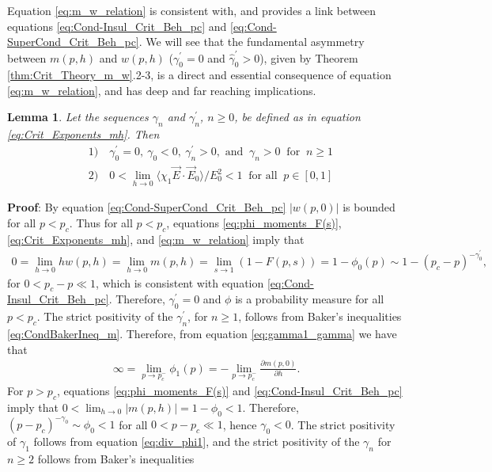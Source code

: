 \documentclass[english,12pt,jmp,graphicx]{revtex4-1}
\newtheorem{lemma}{Lemma}[section]
\newcommand{\gh}{\hat{\gamma}}
\begin{document}
Equation \eqref{eq:m_w_relation} is consistent with, and provides a
link between equations \eqref{eq:Cond-Insul_Crit_Beh_pc} and
\eqref{eq:Cond-SuperCond_Crit_Beh_pc}. We will see that the
fundamental asymmetry  between $m(p,h)$ and $w(p,h)$ ($\gamma_0^\prime=0$ and
$\gh_0^\prime>0$), given by Theorem \ref{thm:Crit_Theory_m_w}.2-3, is a
direct and essential consequence of equation \eqref{eq:m_w_relation},
and has deep and far reaching implications.      
%
\begin{lemma}\label{lem:zero_gamma0}
  Let the sequences $\gamma_n$ and $\gamma_n^\prime$, $n\geq0$, be defined as in
  equation \eqref{eq:Crit_Exponents_mh}. Then
  \begin{align*}
    &1) \quad \gamma_0^\prime=0, \ \gamma_0<0, \ \gamma_n^\prime>0,   \text{ and } \ \gamma_n>0 \
        \text{ for } \ n\geq1 \\
    &2) \quad 0<\lim_{h\to0}\langle\chi_1\vec{E}\cdot\vec{E}_0\rangle/E_0^2<1 \
         \text{ for all } \ p\in[0,1]
  \end{align*}
\end{lemma}
%
\noindent \textbf{Proof}:
%
By equation \eqref{eq:Cond-SuperCond_Crit_Beh_pc} $|w(p,0)|$ is  
bounded for all $p<p_c$. Thus for all $p<p_c$, equations
\eqref{eq:phi_moments_F(s)}, \eqref{eq:Crit_Exponents_mh}, 
and \eqref{eq:m_w_relation} imply that
%
\begin{align*}
  0=\lim_{h\to0}hw(p,h)=\lim_{h\to0}m(p,h)=\lim_{s\to1}(1-F(p,s))=1-\phi_0(p)\sim1-(p_c-p)^{-\gamma_0^\prime},
\end{align*}
%
for $0<p_c-p\ll1$, which is consistent with equation
\eqref{eq:Cond-Insul_Crit_Beh_pc}. Therefore, $\gamma_0^\prime=0$ and $\phi$ is a
probability measure for all $p<p_c$. The strict positivity of the
$\gamma_n^\prime$, for $n\geq1$, follows from Baker's inequalities
\eqref{eq:CondBakerIneq_m}. Therefore, from equation
\eqref{eq:gamma1_gamma} we have that
%
\begin{align}\label{eq:div_phi1}
  \infty=\lim_{p\to p_c^-}\phi_1(p)=-\lim_{p\to p_c^-}\frac{\partial m(p,0)}{\partial h}.
\end{align}
%
For $p>p_c$, equations \eqref{eq:phi_moments_F(s)} and
\eqref{eq:Cond-Insul_Crit_Beh_pc} imply that
$0<\lim_{h\to0}|m(p,h)|=1-\phi_0<1$. Therefore, $(p-p_c)^{-\gamma_0}\sim\phi_0<1$ for
all $0<p-p_c\ll1$, hence $\gamma_0<0$. The strict positivity of $\gamma_1$ follows
from equation \eqref{eq:div_phi1}, and the strict positivity of the
$\gamma_n$ for $n\geq2$ follows from Baker's inequalities
\end{document}
